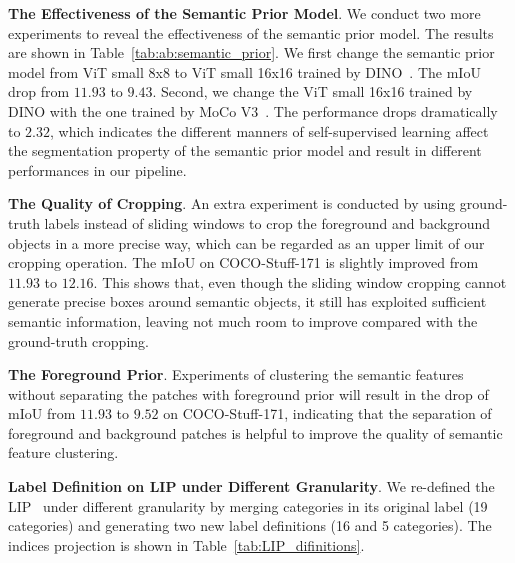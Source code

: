 \documentclass[runningheads]{llncs}
\newcommand{\PAR}[1]{\smallskip \noindent \textbf{#1}}
\newcommand{\tabref}[1]{Table~\ref{#1}}
\begin{document}
\PAR{The Effectiveness of the Semantic Prior Model}. We conduct two more experiments to reveal the effectiveness of the semantic prior model. The results are shown in \tabref{tab:ab:semantic_prior}. We first change the semantic prior model from ViT small 8x8 to ViT small 16x16 trained by DINO~\cite{DINO}. The mIoU drop from $11.93$ to $9.43$. Second, we change the ViT small 16x16 trained by DINO with the one trained by MoCo V3~\cite{MoCoV3}. The performance drops dramatically to $2.32$, which indicates the different manners of self-supervised learning affect the segmentation property of the semantic prior model and result in different performances in our pipeline.



\PAR{The Quality of Cropping}. An extra experiment is conducted by using ground-truth labels instead of sliding windows to crop the foreground and background objects in a more precise way, which can be regarded as an upper limit of our cropping operation. The mIoU on COCO-Stuff-171 is slightly improved from $11.93$ to $12.16$. This shows that, even though the sliding window cropping cannot generate precise boxes around semantic objects, it still has exploited sufficient semantic information, leaving not much room to improve compared with the ground-truth cropping.

\PAR{The Foreground Prior}. Experiments of clustering the semantic features without separating the patches with foreground prior will result in the drop of mIoU from $11.93$ to $9.52$ on COCO-Stuff-171, indicating that the separation of foreground and background patches is helpful to improve the quality of semantic feature clustering.










\PAR{Label Definition on LIP under Different Granularity}. We re-defined the LIP~\cite{gong2017lip} under different granularity by merging categories in its original label (19 categories) and generating two new label definitions (16 and 5 categories). The indices projection is shown in \tabref{tab:LIP_difinitions}. 
\end{document}
